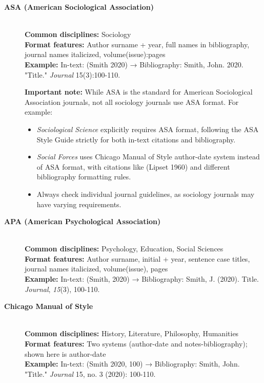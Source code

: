 \documentclass[11pt,a4paper]{ltxdoc}
\begin{document}
\begin{description}
  \item[\textbf{ASA (American Sociological Association)}] \hfill \\
  \textbf{Common disciplines:} Sociology \\
  \textbf{Format features:} Author surname + year, full names in bibliography, journal names italicized, volume(issue):pages \\
  \textbf{Example:} In-text: (Smith 2020) → Bibliography: Smith, John. 2020. "Title." \emph{Journal} 15(3):100-110.
  
  \textbf{Important note:} While ASA is the standard for American Sociological Association journals, not all sociology journals use ASA format. For example:
  \begin{itemize}
    \item \emph{Sociological Science} explicitly requires ASA format, following the ASA Style Guide strictly for both in-text citations and bibliography.
    \item \emph{Social Forces} uses Chicago Manual of Style author-date system instead of ASA format, with citations like (Lipset 1960) and different bibliography formatting rules.
    \item Always check individual journal guidelines, as sociology journals may have varying requirements.
  \end{itemize}
  
  \item[\textbf{APA (American Psychological Association)}] \hfill \\
  \textbf{Common disciplines:} Psychology, Education, Social Sciences \\
  \textbf{Format features:} Author surname, initial + year, sentence case titles, journal names italicized, volume(issue), pages \\
  \textbf{Example:} In-text: (Smith, 2020) → Bibliography: Smith, J. (2020). Title. \emph{Journal}, \emph{15}(3), 100-110.
  
  \item[\textbf{Chicago Manual of Style}] \hfill \\
  \textbf{Common disciplines:} History, Literature, Philosophy, Humanities \\
  \textbf{Format features:} Two systems (author-date and notes-bibliography); shown here is author-date \\
  \textbf{Example:} In-text: (Smith 2020, 100) → Bibliography: Smith, John. "Title." \emph{Journal} 15, no. 3 (2020): 100-110.
  

\end{description}
\end{document}
